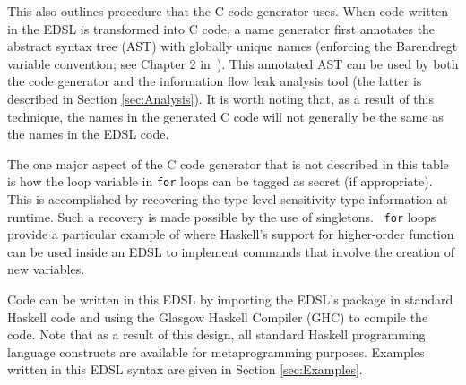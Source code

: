 \documentclass[10pt, conference]{IEEEtran}
\newcommand{\ttt}{\texttt}
\begin{document}
This also outlines procedure that the C code generator uses. When code written
in the EDSL is transformed into C code, a name generator first annotates the
abstract syntax tree (AST) with globally unique names (enforcing the Barendregt
variable convention; see Chapter 2 in~\cite{BarendregtConversion}). This
annotated AST can be used by both the code generator and the information flow
leak analysis tool (the latter is described in Section \ref{sec:Analysis}). It
is worth noting that, as a result of this technique, the names in the generated
C code will not generally be the same as the names in the EDSL code.

The one major aspect of the C code generator that is not described in this table
is how the loop variable in \ttt{for} loops can be tagged as secret (if appropriate).
This is accomplished by recovering the type-level sensitivity type information at
runtime. Such a recovery is made possible by the use of singletons.~\cite{Singletons}
\ttt{for} loops provide a particular example of where Haskell's support for higher-order function
can be used inside an EDSL to implement commands that involve the creation of
new variables.

Code can be written in this EDSL by importing the EDSL's package in standard
Haskell code and using the Glasgow Haskell Compiler (GHC) to compile the code.
Note that as a result of this design, all standard Haskell programming language
constructs are available for metaprogramming purposes.  Examples written in this
EDSL syntax are given in Section \ref{sec:Examples}.
\end{document}
